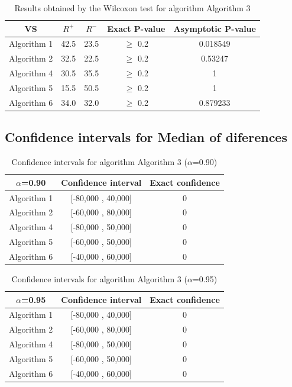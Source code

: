 \documentclass[a4paper,10pt]{article}
\begin{document}
\begin{table}[!htp]
\centering\small
\begin{tabular}{
|c|c|c|c|c|}
\hline
 VS & $R^{+}$ & $R^{-}$ & Exact P-value & Asymptotic P-value \\ \hline 
Algorithm 1 & 42.5 & 23.5 & $\geq$ 0.2 & 0.018549\\ \hline 
Algorithm 2 & 32.5 & 22.5 & $\geq$ 0.2 & 0.53247\\ \hline 
Algorithm 4 & 30.5 & 35.5 & $\geq$ 0.2 & 1\\ \hline 
Algorithm 5 & 15.5 & 50.5 & $\geq$ 0.2 & 1\\ \hline 
Algorithm 6 & 34.0 & 32.0 & $\geq$ 0.2 & 0.879233\\ \hline 

\end{tabular}
\caption{Results obtained by the Wilcoxon test for algorithm Algorithm 3}
\end{table}

\subsection{Confidence intervals for Median of diferences}

\begin{table}[!htp]
\centering\small
\begin{tabular}{
|c|c|c|}
\hline
 $\alpha$=0.90 & Confidence interval & Exact confidence \\ \hline 
Algorithm 1 & [-80,000 , 40,000] & 0\\ \hline 
Algorithm 2 & [-60,000 , 80,000] & 0\\ \hline 
Algorithm 4 & [-80,000 , 50,000] & 0\\ \hline 
Algorithm 5 & [-60,000 , 50,000] & 0\\ \hline 
Algorithm 6 & [-40,000 , 60,000] & 0\\ \hline 

\end{tabular}
\caption{Confidence intervals for algorithm Algorithm 3 ($\alpha$=0.90)}
\end{table}
\begin{table}[!htp]
\centering\small
\begin{tabular}{
|c|c|c|}
\hline
 $\alpha$=0.95 & Confidence interval & Exact confidence \\ \hline 
Algorithm 1 & [-80,000 , 40,000] & 0\\ \hline 
Algorithm 2 & [-60,000 , 80,000] & 0\\ \hline 
Algorithm 4 & [-80,000 , 50,000] & 0\\ \hline 
Algorithm 5 & [-60,000 , 50,000] & 0\\ \hline 
Algorithm 6 & [-40,000 , 60,000] & 0\\ \hline 

\end{tabular}
\caption{Confidence intervals for algorithm Algorithm 3 ($\alpha$=0.95)}
\end{table}
\end{document}
